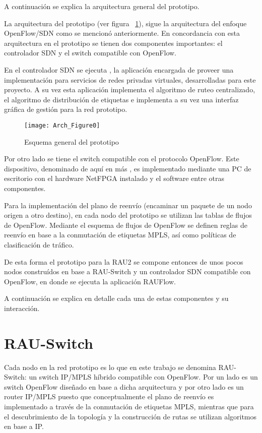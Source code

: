 A continuación se explica la arquitectura general del prototipo. 

La arquitectura del prototipo (ver figura ~\ref{fig:OpenSourceRArch0}), sigue la arquitectura del enfoque OpenFlow/SDN como se mencion\'o anteriormente. En concordancia con esta arquitectura en el prototipo se tienen dos componentes importantes: el controlador SDN y el switch compatible con OpenFlow.

En el controlador SDN se ejecuta , la aplicaci\'on encargada de proveer una implementaci\'on para servicios de redes privadas virtuales, desarrolladas para este proyecto. A su vez esta aplicaci\'on implementa el algoritmo de ruteo  centralizado, el algoritmo de distribución de etiquetas e implementa a su vez una interfaz gr\'afica de gesti\'on para la red prototipo.

\begin{figure}[h] 
\centering    
\texttt{[image: Arch\_Figure0]}
\caption[Esquema general del prototipo]{Esquema general del prototipo}
\label{fig:OpenSourceRArch0}
\end{figure}

Por otro lado se tiene el switch compatible con el protocolo OpenFlow. Este dispositivo, denominado de aqu\'i en m\'as , es implementado mediante una PC de escritorio con el hardware NetFPGA instalado y el software  entre otras componentes.

Para la implementaci\'on del plano de reenvío (encaminar un paquete de un nodo origen a otro destino), en cada nodo del prototipo se utilizan las tablas de flujos de OpenFlow. Mediante el esquema de flujos de OpenFlow se definen reglas de reenv\'io en base a la conmutaci\'on de etiquetas MPLS, as\'i como pol\'iticas de clasificaci\'on de tr\'afico. 

De esta forma el prototipo para la RAU2 se compone entonces de unos pocos nodos constru\'idos en base a RAU-Switch y un controlador SDN compatible con OpenFlow, en donde se ejecuta la aplicaci\'on RAUFlow.

A continuaci\'on se explica en detalle cada una de estas componentes y su interacci\'on.

\section{RAU-Switch}
Cada nodo en la red prototipo es lo que en este trabajo se denomina RAU-Switch: un switch IP/MPLS h\'ibrido compatible con OpenFlow. Por un lado es un switch OpenFlow dise\~nado en base a dicha arquitectura y por otro lado es un router IP/MPLS puesto que conceptualmente el plano de reenvío es implementado a trav\'es de la conmutación de etiquetas MPLS, mientras que para el descubrimiento de la topolog\'ia y la construcci\'on de rutas se utilizan algoritmos en base a IP.

